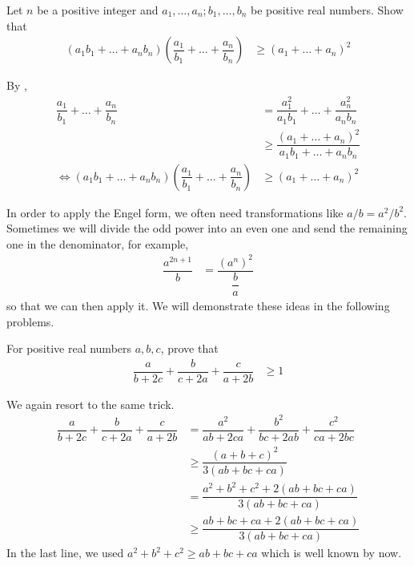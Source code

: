 \documentclass{subfile}
\begin{document}
		\begin{problem}
			Let $n$ be a positive integer and $a_{1},\ldots,a_{n};b_{1},\ldots,b_{n}$ be positive real numbers. Show that
				\begin{align*}
					(a_{1}b_{1}+\ldots+a_{n}b_{n})\left(\dfrac{a_{1}}{b_{1}}+\ldots+\dfrac{a_{n}}{b_{n}}\right)
						& \geq (a_{1}+\ldots+a_{n})^{2}
				\end{align*}

				\begin{solution}
					By ,
						\begin{align*}
							\dfrac{a_{1}}{b_{1}}+\ldots+\dfrac{a_{n}}{b_{n}}
								& = \dfrac{a_{1}^{2}}{a_{1}b_{1}}+\ldots+\dfrac{a_{n}^{2}}{a_{n}b_{n}}\\
								& \geq \dfrac{(a_{1}+\ldots+a_{n})^{2}}{a_{1}b_{1}+\ldots+a_{n}b_{n}}\\
							\iff (a_{1}b_{1}+\ldots+a_{n}b_{n})\left(\dfrac{a_{1}}{b_{1}}+\ldots+\dfrac{a_{n}}{b_{n}}\right)
								& \geq (a_{1}+\ldots+a_{n})^{2}
						\end{align*}
				\end{solution}
		\end{problem}

		\begin{remark}
			In order to apply the Engel form, we often need transformations like $a/b=a^{2}/b^{2}$. Sometimes we will divide the odd power into an even one and send the remaining one in the denominator, for example,
				\begin{align*}
					\dfrac{a^{2n+1}}{b}
						& = \dfrac{\left(a^{n}\right)^{2}}{\dfrac{b}{a}}
				\end{align*}
			so that we can then apply it. We will demonstrate these ideas in the following problems.
		\end{remark}

		\begin{problem}
			For positive real numbers $a,b,c$, prove that
				\begin{align*}
					\dfrac{a}{b+2c}+\dfrac{b}{c+2a}+\dfrac{c}{a+2b}
						& \geq 1
				\end{align*}

				\begin{solution}
					We again resort to the same trick.
						\begin{align*}
							\dfrac{a}{b+2c}+\dfrac{b}{c+2a}+\dfrac{c}{a+2b}
								& = \dfrac{a^{2}}{ab+2ca}+\dfrac{b^{2}}{bc+2ab}+\dfrac{c^{2}}{ca+2bc}\\
								& \geq \dfrac{(a+b+c)^{2}}{3(ab+bc+ca)}\\
								& = \dfrac{a^{2}+b^{2}+c^{2}+2(ab+bc+ca)}{3(ab+bc+ca)}\\
								& \geq \dfrac{ab+bc+ca+2(ab+bc+ca)}{3(ab+bc+ca)}
						\end{align*}
					In the last line, we used $a^{2}+b^{2}+c^{2}\geq ab+bc+ca$ which is well known by now.
				\end{solution}
		\end{problem}
\end{document}
